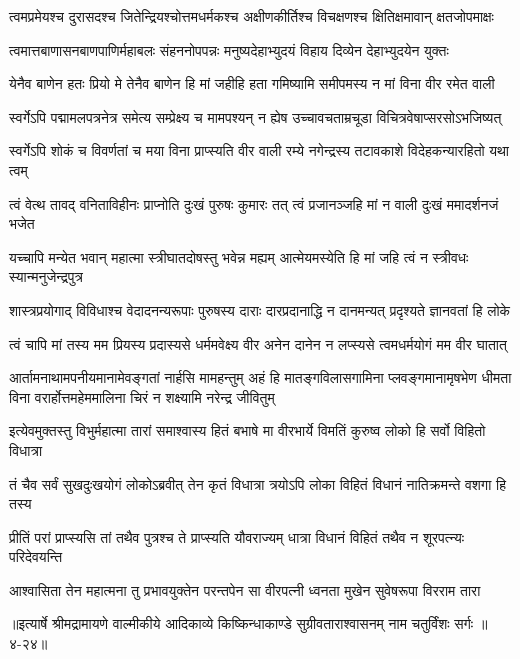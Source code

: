 \twolineshloka
{त्वमप्रमेयश्च दुरासदश्च जितेन्द्रियश्चोत्तमधर्मकश्च}
{अक्षीणकीर्तिश्च विचक्षणश्च क्षितिक्षमावान् क्षतजोपमाक्षः} %

\twolineshloka
{त्वमात्तबाणासनबाणपाणिर्महाबलः संहननोपपन्नः}
{मनुष्यदेहाभ्युदयं विहाय दिव्येन देहाभ्युदयेन युक्तः} %

\twolineshloka
{येनैव बाणेन हतः प्रियो मे तेनैव बाणेन हि मां जहीहि}
{हता गमिष्यामि समीपमस्य न मां विना वीर रमेत वाली} %

\twolineshloka
{स्वर्गेऽपि पद्मामलपत्रनेत्र समेत्य सम्प्रेक्ष्य च मामपश्यन्}
{न ह्येष उच्चावचताम्रचूडा विचित्रवेषाप्सरसोऽभजिष्यत्} %

\twolineshloka
{स्वर्गेऽपि शोकं च विवर्णतां च मया विना प्राप्स्यति वीर वाली}
{रम्ये नगेन्द्रस्य तटावकाशे विदेहकन्यारहितो यथा त्वम्} %

\twolineshloka
{त्वं वेत्थ तावद् वनिताविहीनः प्राप्नोति दुःखं पुरुषः कुमारः}
{तत् त्वं प्रजानञ्जहि मां न वाली दुःखं ममादर्शनजं भजेत} %

\twolineshloka
{यच्चापि मन्येत भवान् महात्मा स्त्रीघातदोषस्तु भवेन्न मह्यम्}
{आत्मेयमस्येति हि मां जहि त्वं न स्त्रीवधः स्यान्मनुजेन्द्रपुत्र} %

\twolineshloka
{शास्त्रप्रयोगाद् विविधाश्च वेदादनन्यरूपाः पुरुषस्य दाराः}
{दारप्रदानाद्धि न दानमन्यत् प्रदृश्यते ज्ञानवतां हि लोके} %

\twolineshloka
{त्वं चापि मां तस्य मम प्रियस्य प्रदास्यसे धर्ममवेक्ष्य वीर}
{अनेन दानेन न लप्स्यसे त्वमधर्मयोगं मम वीर घातात्} %

\threelineshloka
{आर्तामनाथामपनीयमानामेवङ्गतां नार्हसि मामहन्तुम्}
{अहं हि मातङ्गविलासगामिना प्लवङ्गमानामृषभेण धीमता}
{विना वरार्होत्तमहेममालिना चिरं न शक्ष्यामि नरेन्द्र जीवितुम्} %

\twolineshloka
{इत्येवमुक्तस्तु विभुर्महात्मा तारां समाश्वास्य हितं बभाषे}
{मा वीरभार्ये विमतिं कुरुष्व लोको हि सर्वो विहितो विधात्रा} %

\twolineshloka
{तं चैव सर्वं सुखदुःखयोगं लोकोऽब्रवीत् तेन कृतं विधात्रा}
{त्रयोऽपि लोका विहितं विधानं नातिक्रमन्ते वशगा हि तस्य} %

\twolineshloka
{प्रीतिं परां प्राप्स्यसि तां तथैव पुत्रश्च ते प्राप्स्यति यौवराज्यम्}
{धात्रा विधानं विहितं तथैव न शूरपत्न्यः परिदेवयन्ति} %

\twolineshloka
{आश्वासिता तेन महात्मना तु प्रभावयुक्तेन परन्तपेन}
{सा वीरपत्नी ध्वनता मुखेन सुवेषरूपा विरराम तारा} %


॥इत्यार्षे श्रीमद्रामायणे वाल्मीकीये आदिकाव्ये किष्किन्धाकाण्डे सुग्रीवताराश्वासनम् नाम चतुर्विंशः सर्गः ॥४-२४॥
